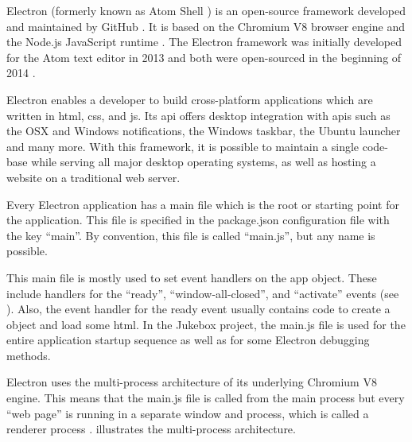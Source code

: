 

Electron (formerly known as Atom Shell \cite{atomShell}) is an open-source framework developed and maintained by GitHub \cite{electron}. It is based on the Chromium V8 browser engine \cite{chromium} and the Node.js JavaScript runtime \cite{nodejs}. The Electron framework was initially developed for the Atom text editor \cite{atom} in 2013 and both were open-sourced in the beginning of 2014 \cite{aboutElectron}.

Electron enables a developer to build cross-platform applications which are written in \gls{html}, \gls{css}, and \gls{js}. Its \gls{api} offers desktop integration with \gls{api}s such as the OSX and Windows notifications, the Windows taskbar, the Ubuntu launcher and many more. With this framework, it is possible to maintain a single code-base while serving all major desktop operating systems, as well as hosting a website on a traditional web server.


Every Electron application has a main file which is the root or starting point for the application. This file is specified in the package.json configuration file with the key \enquote{main}. By convention, this file is called \enquote{main.js}, but any name is possible.

This main file is mostly used to set event handlers on the app object. These include handlers for the \enquote{ready}, \enquote{window-all-closed}, and \enquote{activate} events (see ). Also, the event handler for the ready event usually contains code to create a  object and load some \gls{html}. In the Jukebox project, the main.js file is used for the entire application startup sequence as well as for some Electron debugging methods.


Electron uses the multi-process architecture of its underlying Chromium V8 engine. This means that the main.js file is called from the main process but every \enquote{web page} is running in a separate window and process, which is called a renderer process \cite{electronAppArch}.  illustrates the multi-process architecture.


